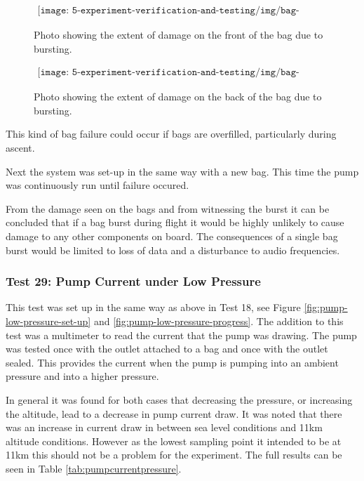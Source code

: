 \begin{figure}[H]
    \begin{align*}
        \texttt{[image: 5-experiment-verification-and-testing/img/bag-burst-front.png]}
    \end{align*}
    \caption {Photo showing the extent of damage on the front of the bag due to bursting.} \label{fig:bag-burst-front}
\end{figure}

\begin{figure}[H]
    \begin{align*}
        \texttt{[image: 5-experiment-verification-and-testing/img/bag-burst-back.png]}
    \end{align*}
    \caption {Photo showing the extent of damage on the back of the bag due to bursting.} \label{fig:bag-burst-back}
\end{figure}

This kind of bag failure could occur if bags are overfilled, particularly during ascent.

Next the system was set-up in the same way with a new bag. This time the pump was continuously run until failure occured. 

From the damage seen on the bags and from witnessing the burst it can be concluded that if a bag burst during flight it would be highly unlikely to cause damage to any other components on board. The consequences of a single bag burst would be limited to loss of data and a disturbance to audio frequencies. 

\subsubsection{Test 29: Pump Current under Low Pressure}

This test was set up in the same way as above in Test 18, see Figure \ref{fig:pump-low-pressure-set-up} and \ref{fig:pump-low-pressure-progress}. The addition to this test was a multimeter to read the current that the pump was drawing. The pump was tested once with the outlet attached to a bag and once with the outlet sealed. This provides the current when the pump is pumping into an ambient pressure and into a higher pressure.

In general it was found for both cases that decreasing the pressure, or increasing the altitude, lead to a decrease in pump current draw. It was noted that there was an increase in current draw in between sea level conditions and 11km altitude conditions. However as the lowest sampling point it intended to be at 11km this should not be a problem for the experiment. The full results can be seen in Table \ref{tab:pumpcurrentpressure}. 

